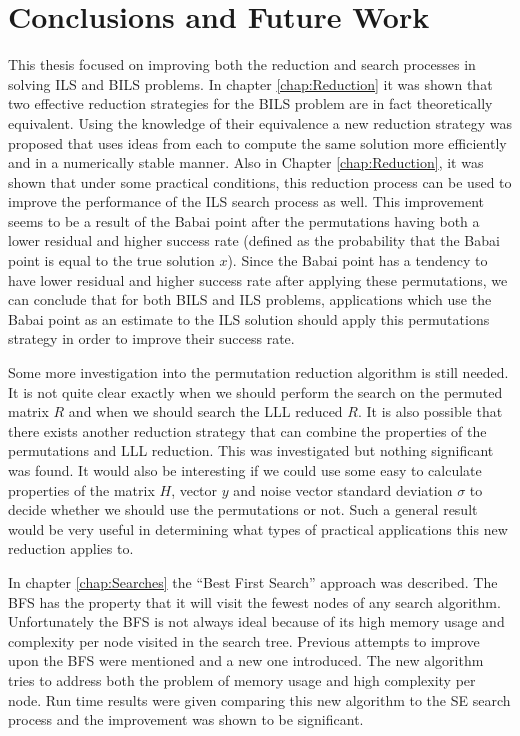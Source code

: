 \documentclass[12pt,Bold,letterpaper]{mcgilletdclass}
\begin{document}
\chapter{Conclusions and Future Work} \label{chap:Conclusion}

This thesis focused on improving both the reduction and search processes in solving ILS and BILS problems. In chapter \ref{chap:Reduction} it was shown that two effective reduction strategies for the BILS problem are in fact theoretically equivalent. Using the knowledge of their equivalence a new reduction strategy was proposed that uses ideas from each to compute the same solution more efficiently and in a numerically stable manner. Also in Chapter \ref{chap:Reduction}, it was shown that under some practical conditions, this reduction process can be used to improve the performance of the ILS search process as well. This improvement seems to be a result of the Babai point after the permutations having both a lower residual and higher success rate (defined as the probability that the Babai point is equal to the true solution $x$). Since the Babai point has a tendency to have lower residual and higher success rate after applying these permutations, we can conclude that for both BILS and ILS problems, applications which use the Babai point as an estimate to the ILS solution should apply this permutations strategy in order to improve their success rate.

Some more investigation into the permutation reduction algorithm is still needed. It is not quite clear exactly when we should perform the search on the permuted matrix $R$ and when we should search the LLL reduced $R$. It is also possible that there exists another reduction strategy that can combine the properties of the permutations and LLL reduction. This was investigated but nothing significant was found. It would also be interesting if we could use some easy to calculate properties of the matrix $H$, vector $y$ and noise vector standard deviation $\sigma$ to decide whether we should use the permutations or not. Such a general result would be very useful in determining what types of practical applications this new reduction applies to.

In chapter \ref{chap:Searches} the ``Best First Search'' approach was described. The BFS has the property that it will visit the fewest nodes of any search algorithm. Unfortunately the BFS is not always ideal because of its high memory usage and complexity per node visited in the search tree. Previous attempts to improve upon the BFS were mentioned and a new one introduced. The new algorithm tries to address both the problem of memory usage and high complexity per node. Run time results were given comparing this new algorithm to the SE search process and the improvement was shown to be significant. 
\end{document}
